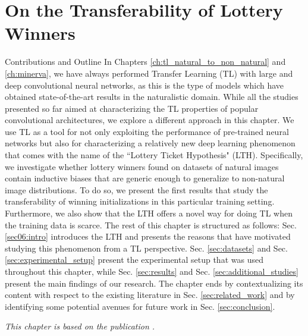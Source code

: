
\chapter{On the Transferability of Lottery Winners} %
\label{ch:tl_lth} %

\begin{remark}{Contributions and Outline}
	In Chapters \ref{ch:tl_natural_to_non_natural} and \ref{ch:minerva}, we have always performed Transfer Learning (TL) with large and deep convolutional neural networks, as this is the type of models which have obtained state-of-the-art results in the naturalistic domain. While all the studies presented so far aimed at characterizing the TL properties of popular convolutional architectures, we explore a different approach in this chapter. We use TL as a tool for not only exploiting the performance of pre-trained neural networks but also for characterizing a relatively new deep learning phenomenon that comes with the name of the ``Lottery Ticket Hypothesis" (LTH). Specifically, we investigate whether lottery winners found on datasets of natural images contain inductive biases that are generic enough to generalize to non-natural image distributions. To do so, we present the first results that study the transferability of winning initializations in this particular training setting. Furthermore, we also show that the LTH offers a novel way for doing TL when the training data is scarce. The rest of this chapter is structured as follows: Sec. \ref{sec06:intro} introduces the LTH and presents the reasons that have motivated studying this phenomenon from a TL perspective. Sec. \ref{sec:datasets} and Sec. \ref{sec:experimental_setup} present the experimental setup that was used throughout this chapter, while Sec. \ref{sec:results} and Sec. \ref{sec:additional_studies} present the main findings of our research. The chapter ends by contextualizing its content with respect to the existing literature in Sec. \ref{sec:related_work} and by identifying some potential avenues for future work in Sec. \ref{sec:conclusion}.

\vspace{5mm}
\textit{This chapter is based on the publication \citet{sabatelli2020transferability}.}

\end{remark}

